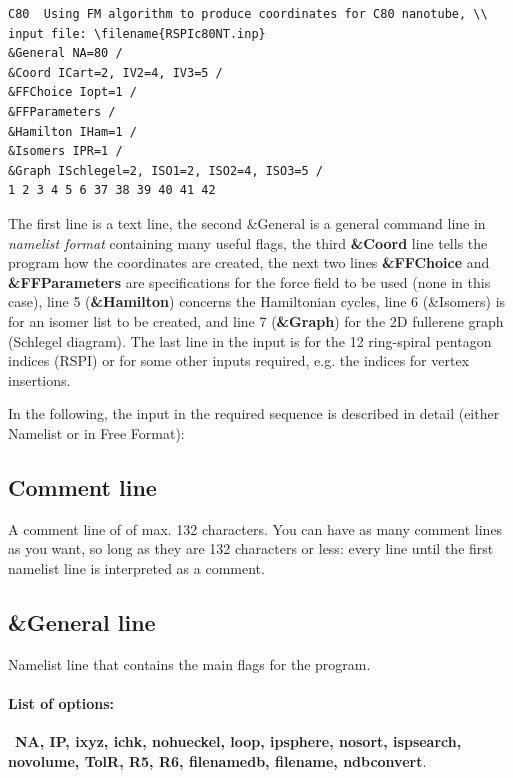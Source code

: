 \documentclass[article,a4paper,twoside]{memoir}
\newcommand{\filename}[1]{\texttt{#1}}
\newcommand{\paramname}[1]{{\color{green}\textbf{#1}}}
\begin{document}
\begin{verbatim}
C80  Using FM algorithm to produce coordinates for C80 nanotube, \\
input file: \filename{RSPIc80NT.inp}
&General NA=80 / 
&Coord ICart=2, IV2=4, IV3=5 / 
&FFChoice Iopt=1 / 
&FFParameters / 
&Hamilton IHam=1 / 
&Isomers IPR=1 / 
&Graph ISchlegel=2, ISO1=2, ISO2=4, ISO3=5 / 
1 2 3 4 5 6 37 38 39 40 41 42 
\end{verbatim}
The first line is a text line, the second \&General is a general
command line in \textit{namelist format} containing many useful flags,
the third \paramname{\&Coord} line tells the program how the
coordinates are created, the next two lines \paramname{\&FFChoice}
and \paramname{\&FFParameters} are specifications for the force field
to be used (none in this case), line 5 (\paramname{\&Hamilton})
concerns the Hamiltonian cycles, line 6 (\&Isomers) is for an isomer list
to be created, and line 7 (\paramname{\&Graph}) for the 2D fullerene
graph (Schlegel diagram). The last line in the input is for the 12
ring-spiral pentagon indices (RSPI) or for some other inputs required, e.g.
the indices for vertex insertions.

In the following, the input in the required sequence is described in detail (either Namelist or in Free Format):

\subsection{Comment line} 
A comment line of of max. 132 characters. You can have as many comment lines as you want, so long as they are 132 characters or less: 
every line until the first namelist line is interpreted as a comment.

\subsection{\&General line}
Namelist line that contains the main flags for the program. 

\paragraph{List of options:}\  \paramname{NA, IP, ixyz, ichk, nohueckel, loop, ipsphere, nosort, ispsearch, novolume, TolR, R5, R6, filenamedb, filename, ndbconvert}.
\end{document}
